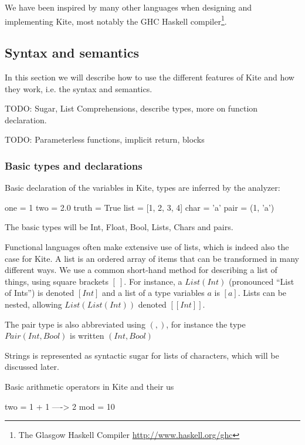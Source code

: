 We have been inspired by many other languages when designing and
implementing Kite, most notably the GHC Haskell compiler\footnote{The
  Glasgow Haskell Compiler \url{http://www.haskell.org/ghc}}.

\subsection{Syntax and semantics}
In this section we will describe how to use the different features of Kite and how they work, i.e. the syntax and semantics.

TODO: Sugar, List Comprehensions, describe types, more on function declaration.

TODO: Parameterless functions, implicit return, blocks

\subsubsection{Basic types and declarations}

Basic declaration of the variables in Kite, types are inferred by the analyzer:
\begin{kite}
  
  one = 1
  two = 2.0
  truth = True
  list = [1, 2, 3, 4]
  char = 'a' 
  pair = (1, 'a')
\end{kite}

The basic types will be Int, Float, Bool, Lists, Chars and
pairs.

Functional languages often make extensive use of lists, which is
indeed also the case for Kite. A list is an ordered array of items
that can be transformed in many different ways. We use a common
short-hand method for describing a list of things, using square
brackets $[\ ]$. For instance, a $List(Int)$ (pronounced ``List of
Ints'') is denoted $[Int]$ and a list of a type variables $a$ is
$[a]$. Lists can be nested, allowing $List(List(Int))$ denoted
$[[Int]]$.

The pair type is also abbreviated using $(,)$, for instance the type
$Pair(Int, Bool)$ is written $(Int, Bool)$

Strings is represented as syntactic sugar for lists of characters,
which will be discussed later.

Basic arithmetic operators in Kite and their us
\begin{kite}

  two = 1 + 1  ---->  2
  mod = 10 %
\end{kite}

